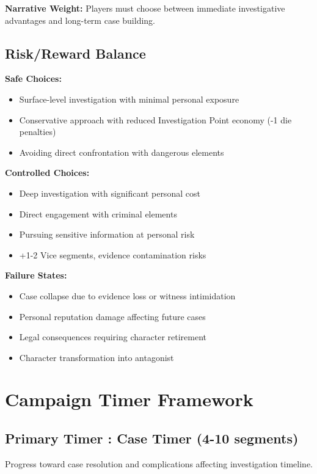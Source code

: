 \documentclass[11pt]{article}
\begin{document}
\textbf{Narrative Weight:} Players must choose between immediate investigative advantages and long-term case building.

\subsection{Risk/Reward Balance}

\textbf{Safe Choices:}
\begin{itemize}
\item Surface-level investigation with minimal personal exposure
\item Conservative approach with reduced Investigation Point economy (-1 die penalties)
\item Avoiding direct confrontation with dangerous elements
\end{itemize}

\textbf{Controlled Choices:}
\begin{itemize}
\item Deep investigation with significant personal cost
\item Direct engagement with criminal elements
\item Pursuing sensitive information at personal risk
\item +1-2 Vice segments, evidence contamination risks
\end{itemize}

\textbf{Failure States:}
\begin{itemize}
\item Case collapse due to evidence loss or witness intimidation
\item Personal reputation damage affecting future cases
\item Legal consequences requiring character retirement
\item Character transformation into antagonist
\end{itemize}

\section{Campaign Timer Framework}

\subsection{Primary Timer : Case Timer (4-10 segments)}

Progress toward case resolution and complications affecting investigation timeline.
\end{document}
